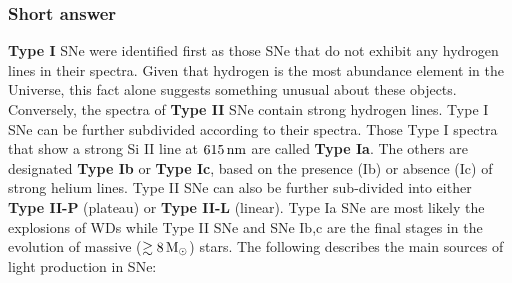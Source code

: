 \documentclass[a4paper,10pt]{article}
\begin{document}
\subsubsection{Short answer}

\textbf{Type I} SNe were identified first as those SNe that do not exhibit any hydrogen lines in their spectra. Given that hydrogen is the most abundance element in the Universe, this fact alone suggests something unusual about these objects. Conversely, the spectra of \textbf{Type II} SNe contain strong hydrogen lines. Type I SNe can be further subdivided according to their spectra. Those Type I spectra that show a strong Si II line at $615\,{\rm nm}$ are called \textbf{Type Ia}. The others are designated \textbf{Type Ib} or \textbf{Type Ic}, based on the presence (Ib) or absence (Ic) of strong helium lines. Type II SNe can also be further sub-divided into either \textbf{Type II-P} (plateau) or \textbf{Type II-L} (linear). Type Ia SNe are most likely the explosions of WDs while Type II SNe and SNe Ib,c are the final stages in the evolution of massive ($\gtrsim8\,{\rm M}_\odot$) stars. The following describes the main sources of light production in SNe:
\end{document}
